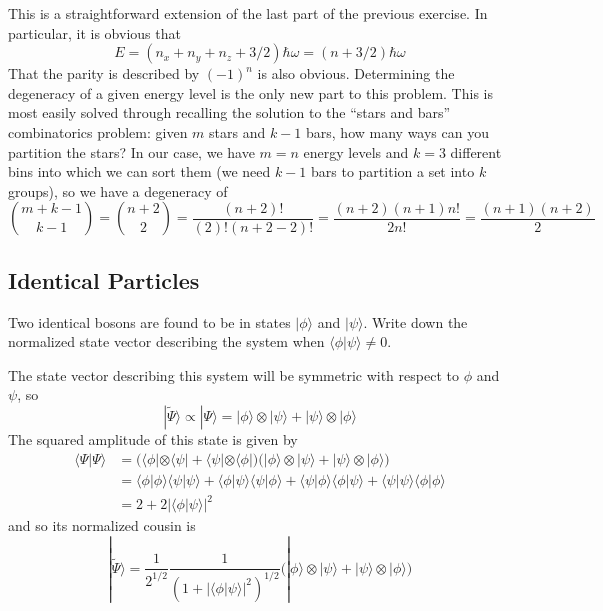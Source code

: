 \documentclass[../principles-of-quantum-mechanics.tex]{subfiles}
\begin{document}
\begin{questions}
		\begin{solution}
			This is a straightforward extension of the last part of the previous exercise. In particular, it is obvious that
			$$E = (n_x + n_y + n_z + 3/2)\hbar\omega = (n + 3/2)\hbar\omega$$
			That the parity is described by $(-1)^n$ is also obvious. Determining the degeneracy of a given energy level is the only new part to this problem. This is most easily solved through recalling the solution to the ``stars and bars'' combinatorics problem: given $m$ stars and $k - 1$ bars, how many ways can you partition the stars? In our case, we have $m = n$ energy levels and $k = 3$ different bins into which we can sort them (we need $k - 1$ bars to partition a set into $k$ groups), so we have a degeneracy of
			$${m + k - 1\choose k - 1} = {n + 2\choose 2} = \frac{(n+2)!}{(2)!(n + 2 - 2)!} = \frac{(n + 2)(n+1)n!}{2n!} = \frac{(n + 1)(n + 2)}{2}$$
		\end{solution}
		
		\setcounter{subsection}{2}
		\setcounter{question}{0}
		\subsection{Identical Particles}
		\question Two identical bosons are found to be in states $|\phi\rangle$ and $|\psi\rangle$. Write down the normalized state vector describing the system when $\langle \phi|\psi\rangle \neq 0$.
		
		\begin{solution}
			The state vector describing this system will be symmetric with respect to $\phi$ and $\psi$, so
			$$|\tilde{\Psi}\rangle \propto |\Psi\rangle = |\phi\rangle\otimes|\psi\rangle + |\psi\rangle\otimes|\phi\rangle$$
			The squared amplitude of this state is given by
			\begin{align*}
				\langle\Psi|\Psi\rangle &= \Big(\langle\phi|\otimes\langle\psi| + \langle\psi|\otimes\langle\phi|\Big)\Big(|\phi\rangle\otimes|\psi\rangle + |\psi\rangle\otimes|\phi\rangle\Big) \\
				&= \langle\phi|\phi\rangle\langle\psi|\psi\rangle + \langle\phi|\psi\rangle\langle\psi|\phi\rangle + \langle\psi|\phi\rangle\langle\phi|\psi\rangle + \langle\psi|\psi\rangle\langle\phi|\phi\rangle \\
				&= 2 + 2|\langle\phi|\psi\rangle|^2
			\end{align*}
			and so its normalized cousin is
			$$|\tilde{\Psi}\rangle = \frac{1}{2^{1/2}}\frac{1}{(1 + |\langle\phi|\psi\rangle|^2)^{1/2}}\Big(|\phi\rangle\otimes|\psi\rangle + |\psi\rangle\otimes|\phi\rangle\Big)$$
		\end{solution}
		

\end{questions}
\end{document}
